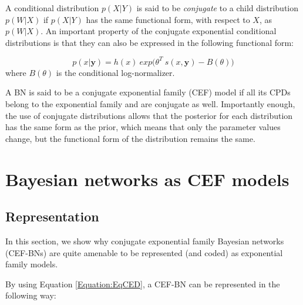 \documentclass[11pt, oneside]{article}   	%
\newcommand{\bm}{\mathbf}
\numberwithin{figure}{section}
\numberwithin{equation}{section}
\numberwithin{table}{section}
\theoremstyle{definition}
\begin{document}
A conditional distribution $p(X|Y)$ is said to be \textit{conjugate} to a child distribution $p(W|X)$ if $p(X|Y)$ has the same functional form, with respect to $X$, as $p(W|X)$. An important property of the conjugate exponential conditional distributions is that they can also be expressed in the following functional form:
 
\begin{equation}
\label{Equation:EqCED}
p(x | \bm y) = h(x)~exp\big(\theta^T~s(x,\bm y) - B(\theta) \big) 
\end{equation}
\noindent where $B(\theta)$ is the conditional log-normalizer. 

A BN is said to be a conjugate exponential family (CEF) model if all its CPDs belong to the exponential family and are conjugate as well. Importantly enough, the use of conjugate distributions allows that the posterior for each distribution has the same form as the prior, which means that only the parameter values change, but the functional form of the distribution remains the same.

\section{Bayesian networks as CEF models}\label{Section:CEFBN}

\subsection{Representation} \label{Section:CEFBN:Representation}

In this section, we show why conjugate exponential family Bayesian networks (CEF-BNs) are quite amenable to be represented (and coded) as exponential family models. 

By using Equation \ref{Equation:EqCED}, a CEF-BN can be represented in the following way: 
\end{document}
